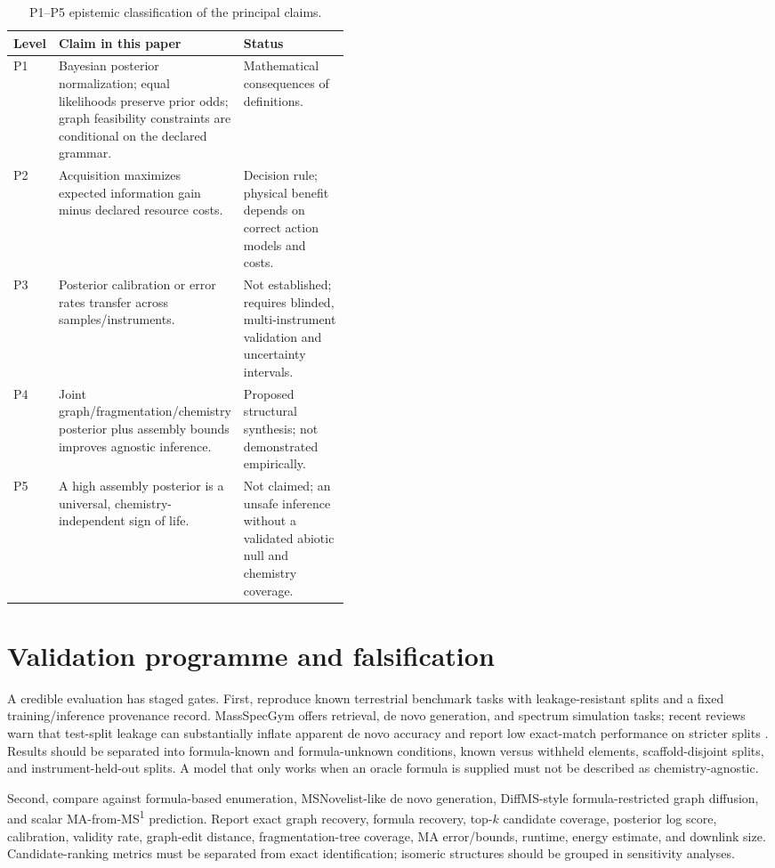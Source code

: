 \documentclass[10pt,a4paper]{article}
\begin{document}
\begin{table}[H]
\centering\small
\caption{P1--P5 epistemic classification of the principal claims.}
\label{tab:epistemic}
\begin{tabularx}{\linewidth}{p{0.10\linewidth}p{0.34\linewidth}X}
\toprule
Level & Claim in this paper & Status \\
\midrule
P1 & Bayesian posterior normalization; equal likelihoods preserve prior odds; graph feasibility constraints are conditional on the declared grammar. & Mathematical consequences of definitions. \\
P2 & Acquisition maximizes expected information gain minus declared resource costs. & Decision rule; physical benefit depends on correct action models and costs. \\
P3 & Posterior calibration or error rates transfer across samples/instruments. & Not established; requires blinded, multi-instrument validation and uncertainty intervals. \\
P4 & Joint graph/fragmentation/chemistry posterior plus assembly bounds improves agnostic inference. & Proposed structural synthesis; not demonstrated empirically. \\
P5 & A high assembly posterior is a universal, chemistry-independent sign of life. & Not claimed; an unsafe inference without a validated abiotic null and chemistry coverage. \\
\bottomrule
\end{tabularx}
\end{table}

\section{Validation programme and falsification}
A credible evaluation has staged gates. First, reproduce known terrestrial benchmark tasks with leakage-resistant splits and a fixed training/inference provenance record. MassSpecGym offers retrieval, de novo generation, and spectrum simulation tasks; recent reviews warn that test-split leakage can substantially inflate apparent de novo accuracy and report low exact-match performance on stricter splits \cite{Bushuiev2024,Schneider2026}. Results should be separated into formula-known and formula-unknown conditions, known versus withheld elements, scaffold-disjoint splits, and instrument-held-out splits. A model that only works when an oracle formula is supplied must not be described as chemistry-agnostic.

Second, compare against formula-based enumeration, MSNovelist-like de novo generation, DiffMS-style formula-restricted graph diffusion, and scalar MA-from-MS\textsuperscript{1} prediction. Report exact graph recovery, formula recovery, top-$k$ candidate coverage, posterior log score, calibration, validity rate, graph-edit distance, fragmentation-tree coverage, MA error/bounds, runtime, energy estimate, and downlink size. Candidate-ranking metrics must be separated from exact identification; isomeric structures should be grouped in sensitivity analyses.
\end{document}
